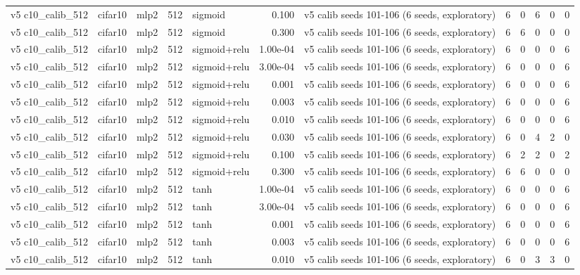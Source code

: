 \begin{table}[htbp]
{\begin{tabular}{@{}lllrlrlrrrrr@{}}
v5 c10\_calib\_512 & cifar10 & mlp2 & 512 & sigmoid & 0.100 & v5 calib seeds 101-106 (6 seeds, exploratory) & 6 & 0 & 6 & 0 & 0 \\
v5 c10\_calib\_512 & cifar10 & mlp2 & 512 & sigmoid & 0.300 & v5 calib seeds 101-106 (6 seeds, exploratory) & 6 & 6 & 0 & 0 & 0 \\
v5 c10\_calib\_512 & cifar10 & mlp2 & 512 & sigmoid+relu & 1.00e-04 & v5 calib seeds 101-106 (6 seeds, exploratory) & 6 & 0 & 0 & 0 & 6 \\
v5 c10\_calib\_512 & cifar10 & mlp2 & 512 & sigmoid+relu & 3.00e-04 & v5 calib seeds 101-106 (6 seeds, exploratory) & 6 & 0 & 0 & 0 & 6 \\
v5 c10\_calib\_512 & cifar10 & mlp2 & 512 & sigmoid+relu & 0.001 & v5 calib seeds 101-106 (6 seeds, exploratory) & 6 & 0 & 0 & 0 & 6 \\
v5 c10\_calib\_512 & cifar10 & mlp2 & 512 & sigmoid+relu & 0.003 & v5 calib seeds 101-106 (6 seeds, exploratory) & 6 & 0 & 0 & 0 & 6 \\
v5 c10\_calib\_512 & cifar10 & mlp2 & 512 & sigmoid+relu & 0.010 & v5 calib seeds 101-106 (6 seeds, exploratory) & 6 & 0 & 0 & 0 & 6 \\
v5 c10\_calib\_512 & cifar10 & mlp2 & 512 & sigmoid+relu & 0.030 & v5 calib seeds 101-106 (6 seeds, exploratory) & 6 & 0 & 4 & 2 & 0 \\
v5 c10\_calib\_512 & cifar10 & mlp2 & 512 & sigmoid+relu & 0.100 & v5 calib seeds 101-106 (6 seeds, exploratory) & 6 & 2 & 2 & 0 & 2 \\
v5 c10\_calib\_512 & cifar10 & mlp2 & 512 & sigmoid+relu & 0.300 & v5 calib seeds 101-106 (6 seeds, exploratory) & 6 & 6 & 0 & 0 & 0 \\
v5 c10\_calib\_512 & cifar10 & mlp2 & 512 & tanh & 1.00e-04 & v5 calib seeds 101-106 (6 seeds, exploratory) & 6 & 0 & 0 & 0 & 6 \\
v5 c10\_calib\_512 & cifar10 & mlp2 & 512 & tanh & 3.00e-04 & v5 calib seeds 101-106 (6 seeds, exploratory) & 6 & 0 & 0 & 0 & 6 \\
v5 c10\_calib\_512 & cifar10 & mlp2 & 512 & tanh & 0.001 & v5 calib seeds 101-106 (6 seeds, exploratory) & 6 & 0 & 0 & 0 & 6 \\
v5 c10\_calib\_512 & cifar10 & mlp2 & 512 & tanh & 0.003 & v5 calib seeds 101-106 (6 seeds, exploratory) & 6 & 0 & 0 & 0 & 6 \\
v5 c10\_calib\_512 & cifar10 & mlp2 & 512 & tanh & 0.010 & v5 calib seeds 101-106 (6 seeds, exploratory) & 6 & 0 & 3 & 3 & 0 \\

\end{tabular}}
\end{table}
